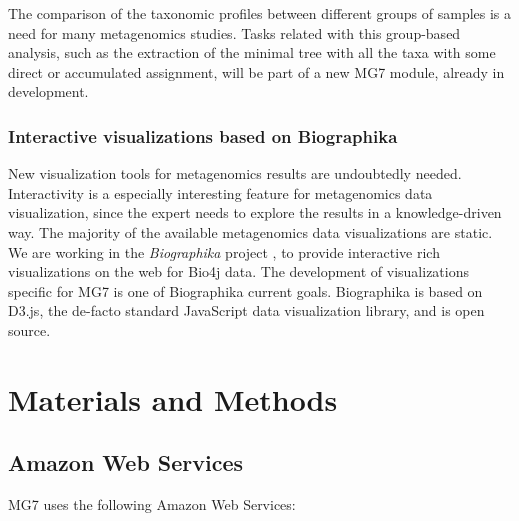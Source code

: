 \documentclass[fleqn,10pt,lineno]{wlpeerj}
\let\OldHref\href
\renewcommand{\href}[2]{\OldHref[pdfnewwindow]{#1}{{#2}}}
\providecommand{\tightlist}{%
\setlength{\itemsep}{0pt}\setlength{\parskip}{0pt}}
\begin{document}
The comparison of the taxonomic profiles between different groups of
samples is a need for many metagenomics studies. Tasks related with this
group-based analysis, such as the extraction of the minimal tree with
all the taxa with some direct or accumulated assignment, will be part of
a new MG7 module, already in development.

\subsubsection{Interactive visualizations based on
Biographika}\label{interactive-visualizations-based-on-biographika}

New visualization tools for metagenomics results are undoubtedly needed.
Interactivity is a especially interesting feature for metagenomics data
visualization, since the expert needs to explore the results in a
knowledge-driven way. The majority of the available metagenomics data
visualizations are static. We are working in the \emph{Biographika}
project \citep{tobes2015biographika}, to provide interactive rich
visualizations on the web for Bio4j data. The development of
visualizations specific for MG7 is one of Biographika current goals.
Biographika is based on D3.js, the de-facto standard JavaScript data
visualization library, and is open source.

\section{Materials and Methods}\label{materials-and-methods}

\subsection{Amazon Web Services}\label{amazon-web-services}

MG7 uses the following Amazon Web Services:

\end{document}
